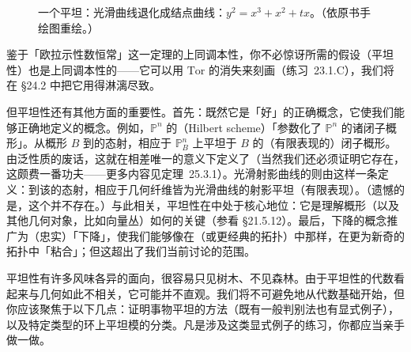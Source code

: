 \begin{figure}[htbp]
\centering
{}
\caption{一个平坦\trFamily：光滑曲线退化成结点曲线：$y^2=x^3+x^2+tx$。（依原书手绘图重绘。）}\label{fig:flat-nodal-degeneration}
\end{figure}

鉴于「欧拉示性数恒常」这一定理的上同调本性，你不必惊讶所需的假设（平坦性）也是上同调本性的——它可以用 $\mathrm{Tor}$ 的消失来刻画（\mbox{练习~23.1.C}），我们将在 \S24.2 中把它用得淋漓尽致。

但平坦性还有其他方面的重要性。首先：既然它是「好\trFamily」的正确概念，它使我们能够正确地定义\trModuliSpace{}的概念。例如，$\mathbb{P}^n$ 的\emph{\trHilbertScheme}（Hilbert scheme）「参数化了 $\mathbb{P}^n$ 的诸闭子概形」。从概形 $B$ 到\trHilbertScheme{}的态射，相应于 $\mathbb{P}^n_B$ 上平坦于 $B$ 的（有限表现的）闭子概形。由泛性质的废话，这就在相差唯一\trIsomorphism{}的意义下定义了\trHilbertScheme（当然我们还必须证明它存在，这颇费一番功夫——更多内容见\mbox{定理~25.3.1}）。光滑射影曲线的\trModuliSpace{}则由这样一条\trUniversalProperty{}定义：到该\trModuliSpace{}的态射，相应于几何纤维皆为光滑曲线的射影平坦（有限表现）\trFamily。（遗憾的是，这个\trModuliSpace{}并不存在。）与此相关，平坦性在\trDeformationTheory{}中处于核心地位：它是理解概形（以及其他几何对象，比如向量丛）如何\trDeformation{}的关键（参看 \S21.5.12）。最后，\trGalois{}下降的概念推广为（忠实）「\trFlat{}下降」，使我们能够像在\trZariskiTopology{}（或更经典的拓扑）中那样，在更为新奇的\trGrothendieck{}拓扑中「粘合」；但这超出了我们当前讨论的范围。

平坦性有许多风味各异的面向，很容易只见树木、不见森林。由于平坦性的代数看起来与几何如此不相关，它可能并不直观。我们将不可避免地从代数基础开始，但你应该聚焦于以下几点：证明事物平坦的方法（既有一般判别法也有显式例子），以及特定类型的环上平坦模的分类。凡是涉及这类显式例子的练习，你都应当亲手做一做。

